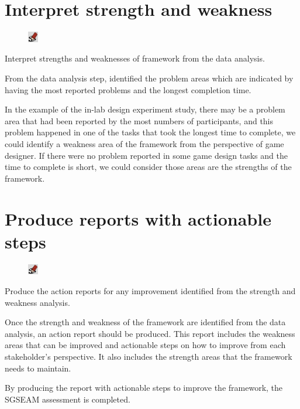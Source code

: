 \documentclass[11pt,oneside]{book}
\begin{document}
\section{Interpret strength and weakness}
\begin{shadebox}
\begin{figure}
\vspace{-15pt}\hspace{-10pt}
    \includegraphics[width=0.04\textwidth]{note-icon}
\end{figure}
Interpret strengths and weaknesses of framework from the data analysis.
\end{shadebox}

From the data analysis step, identified the problem areas which are indicated by having the most reported problems and the 
longest completion time. 

In the example of the in-lab design experiment study, there may be a problem area that had been reported by the most numbers
of participants, and this problem happened in one of the tasks that took the longest time to complete, we could identify a weakness 
area of the framework from the perspective of game designer. If there were no problem reported in some game design tasks and 
the time to complete is short, we could consider those areas are the strengths of the framework.

\section{Produce reports with actionable steps}
\begin{shadebox}
\begin{figure}
\vspace{-15pt}\hspace{-10pt}
    \includegraphics[width=0.04\textwidth]{note-icon}
\end{figure}
Produce the action reports for any improvement identified from the strength and weakness analysis.
\end{shadebox}

Once the strength and weakness of the framework are identified from the data analysis, an action report should be produced. 
This report includes the weakness areas that can be improved and actionable steps on how to improve from 
each stakeholder's perspective. It also includes the strength areas that the framework needs to maintain.

By producing the report with actionable steps to improve the framework, the SGSEAM assessment is completed.  

\end{document}
